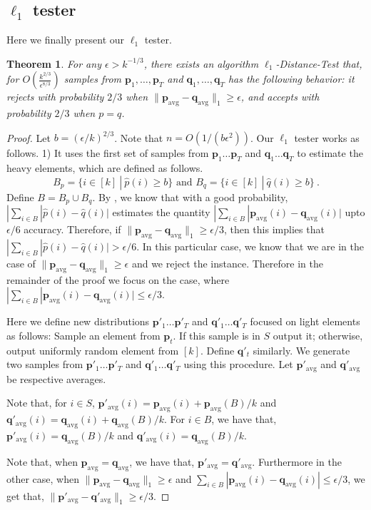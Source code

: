 \documentclass[10pt]{article} %
\theoremstyle{plain}
\newtheorem{theorem}{Theorem}
\newcommand{\bp}{\textbf{p}}
\newcommand{\bq}{\textbf{q}}
\newcommand{\avg}{\mathrm{avg}}
\begin{document}
\subsection{$\ell_1$ tester}
Here we finally present our $\ell_1$ tester.
\begin{theorem}
	For any $\epsilon>k^{-1/3}$, there exists an algorithm $\ell_1$-Distance-Test that, for $O(\frac{k^{2/3}}{\epsilon^{8/3}})$ samples from $\bp_1,\dots,\bp_T$ and $\bq_1,\dots,\bq_T$ has the following behavior: it rejects with probability $2/3$ when $\| \bp_{\avg} - \bq_{\avg}\|_1 \geq \epsilon$, and accepts with probability $2/3$ when $p = q$.    
\end{theorem}
\begin{proof}
	Let $b= (\epsilon/k)^{2/3}$. Note that $n=O(1/(b\epsilon^2))$. Our $\ell_1$ tester works as follows. 1) It uses the first set of samples from $\bp_{1} \dots \bp_{T}$ and $\bq_{1} \dots \bq_{T}$ to estimate the heavy elements, which are defined as follows.
	$$B_p= \{i \in [k]~|~ \hat{p}(i) \geq b\} \text{ and } B_q= \{i \in [k]~|~ \hat{q}(i) \geq b\}~.$$
	Define $B = B_{p} \cup B_{q}$. By , we know that with a good probability, $|\sum_{i \in B}|\hat{p}(i)-\hat{q}(i)|$ estimates the quantity $|\sum_{i \in B} |\bp_{\avg}(i)-\bq_{\avg}(i)|$ upto $\epsilon/6$ accuracy. Therefore, if $\|\bp_{\avg} -\bq_{\avg}\|_1 \geq \epsilon/3$, then this implies that $|\sum_{i \in B}|\hat{p}(i)-\hat{q}(i)| > \epsilon/6$. In this particular case, we know that we are in the case of $\|\bp_{\avg} -\bq_{\avg}\|_1 \geq \epsilon$ and we reject the instance. Therefore in the remainder of the proof we focus on the case, where $|\sum_{i \in B} |\bp_{\avg}(i)-\bq_{\avg}(i)| \leq \epsilon/3$. 
	
	Here we define new distributions $\bp'_{1} \dots \bp'_{T}$ and $\bq'_{1} \dots \bq'_{T}$ focused on light elements as follows: Sample an element from $\bp_{t}$. If this sample is in $S$ output it; otherwise, output uniformly random element from $[k]$. Define $\bq'_t$ similarly. We generate two samples from $\bp'_{1} \dots \bp'_{T}$ and $\bq'_{1} \dots \bq'_{T}$ using this procedure. Let $\bp'_{\avg}$ and $\bq'_{\avg}$ be respective averages.
	
	Note that, for $i \in S$, $\bp'_{\avg}(i)=\bp_{\avg}(i) + \bp_{\avg}(B)/k$ and $\bq'_{\avg}(i)=\bq_{\avg}(i) + \bq_{\avg}(B)/k$. For $i \in B$, we have that, $\bp'_{\avg}(i) =\bq_{\avg}(B)/k$ and $\bq'_{\avg}(i) =\bq_{\avg}(B)/k$. 
	
	Note that, when $\bp_{\avg} = \bq_{\avg}$, we have that, $\bp'_{\avg} = \bq'_{\avg}$. Furthermore in the other case, when $\|\bp_{\avg} - \bq_{\avg}\|_{1} \geq \epsilon$ and $\sum_{i \in B}|\bp_{\avg}(i)-\bq_{\avg}(i)| \leq \epsilon/3$, we get that,
	$\|\bp'_{\avg} - \bq'_{\avg}\|_{1} \geq \epsilon/3$. 
    

\end{proof}
\end{document}
